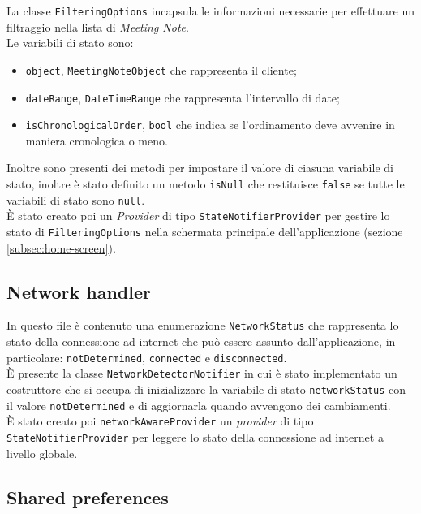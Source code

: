 La classe \lstinline{FilteringOptions} incapsula le informazioni necessarie per effettuare un filtraggio nella lista di \emph{Meeting Note}.\\
Le variabili di stato sono:
\begin{itemize}
    \item \lstinline{object}, \lstinline{MeetingNoteObject} che rappresenta il \gls{cliente}\glsoccur;
    \item \lstinline{dateRange}, \lstinline{DateTimeRange} che rappresenta l'intervallo di date;
    \item \lstinline{isChronologicalOrder}, \lstinline{bool} che indica se l'ordinamento deve avvenire in maniera cronologica o meno.
\end{itemize}
Inoltre sono presenti dei metodi per impostare il valore di ciasuna variabile di stato, inoltre è stato definito un metodo \lstinline{isNull} che restituisce \lstinline{false} se tutte le variabili di stato sono \lstinline{null}. \\
È stato creato poi un \emph{Provider} di tipo \lstinline{StateNotifierProvider}\cite{site:state-notifier-provider} per gestire lo stato di \lstinline{FilteringOptions} nella schermata principale dell'applicazione (sezione \ref{subsec:home-screen}).

\subsection{Network handler}
\label{subsec:network-handler}

In questo file è contenuto una enumerazione \lstinline{NetworkStatus} che rappresenta lo stato della connessione ad internet che può essere assunto dall'applicazione, in particolare: \lstinline{notDetermined}, \lstinline{connected} e \lstinline{disconnected}. \\
È presente la classe \lstinline{NetworkDetectorNotifier} in cui è stato implementato un costruttore che si occupa di inizializzare la variabile di stato \lstinline{networkStatus} con il valore \lstinline{notDetermined} e di aggiornarla quando avvengono dei cambiamenti. \\
È stato creato poi \lstinline{networkAwareProvider} un \emph{provider} di tipo \lstinline{StateNotifierProvider}\cite{site:state-notifier-provider} per leggere lo stato della connessione ad internet a livello globale.

\subsection{Shared preferences}
\label{subsec:shared-preferences}

